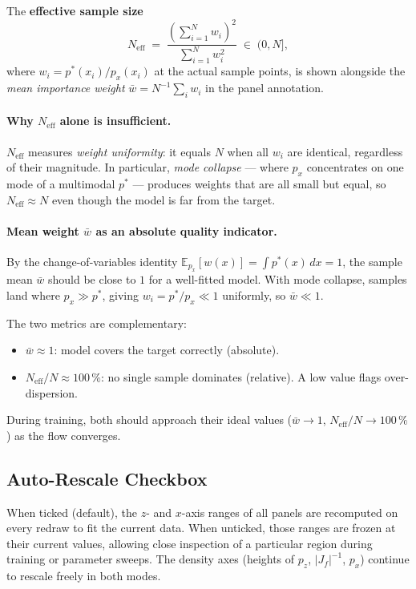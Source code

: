 \documentclass[11pt,a4paper]{article}
\newcommand{\pz}{p_z}
\newcommand{\px}{p_x}
\newcommand{\Jf}{J_{\!f}}
\begin{document}
The \textbf{effective sample size}
\begin{equation}
  N_{\mathrm{eff}} \;=\;
  \frac{\left(\displaystyle\sum_{i=1}^N w_i\right)^{\!2}}
       {\displaystyle\sum_{i=1}^N w_i^2}
  \;\in\; (0, N],
  \label{eq:neff}
\end{equation}
where $w_i = p^*(x_i)/\px(x_i)$ at the actual sample points, is shown
alongside the \emph{mean importance weight} $\bar w = N^{-1}\sum_i w_i$
in the panel annotation.

\paragraph{Why $N_{\mathrm{eff}}$ alone is insufficient.}
$N_{\mathrm{eff}}$ measures \emph{weight uniformity}: it equals $N$ when
all $w_i$ are identical, regardless of their magnitude.
In particular, \emph{mode collapse} — where $\px$ concentrates on one
mode of a multimodal $p^*$ — produces weights that are all small but
equal, so $N_{\mathrm{eff}} \approx N$ even though the model is far from
the target.

\paragraph{Mean weight $\bar w$ as an absolute quality indicator.}
By the change-of-variables identity
$\mathbb{E}_{p_x}[w(x)] = \int p^*(x)\,dx = 1$,
the sample mean $\bar w$ should be close to $1$ for a well-fitted model.
With mode collapse, samples land where $\px \gg p^*$, giving
$w_i = p^*/\px \ll 1$ uniformly, so $\bar w \ll 1$.

The two metrics are complementary:
\begin{itemize}
  \item $\bar w \approx 1$: model covers the target correctly (absolute).
  \item $N_{\mathrm{eff}}/N \approx 100\,\%$: no single sample dominates
        (relative).  A low value flags over-dispersion.
\end{itemize}
During training, both should approach their ideal values ($\bar w\to 1$,
$N_{\mathrm{eff}}/N \to 100\,\%$) as the flow converges.

\subsection{Auto-Rescale Checkbox}

When ticked (default), the $z$- and $x$-axis ranges of all panels are
recomputed on every redraw to fit the current data.  When unticked, those
ranges are frozen at their current values, allowing close inspection of a
particular region during training or parameter sweeps.  The density axes
(heights of $\pz$, $|\Jf|^{-1}$, $\px$) continue to rescale freely in
both modes.
\end{document}
